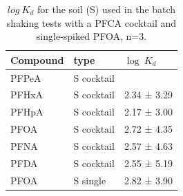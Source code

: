 \begin{table}[ht]
\caption{$log~K_d$ for the soil (S) used in the batch shaking tests with a PFCA cocktail and single-spiked PFOA, n=3.}
\centering
\label{apptab:soil_Kd}
\begin{tabular}{lll} \toprule
Compound & type       & $\log~K_d$ \\ \midrule
PFPeA    & S cocktail &                                 \\
PFHxA    & S cocktail & 2.34  ± 3.29                     \\
PFHpA    & S cocktail & 2.17  ± 3.00                     \\
PFOA     & S cocktail & 2.72  ± 4.35                     \\
PFNA     & S cocktail & 2.57  ± 4.63                     \\
PFDA     & S cocktail & 2.55  ± 5.19                     \\
PFOA     & S single   & 2.82 ± 3.90  \\ \bottomrule
\end{tabular}
\end{table}